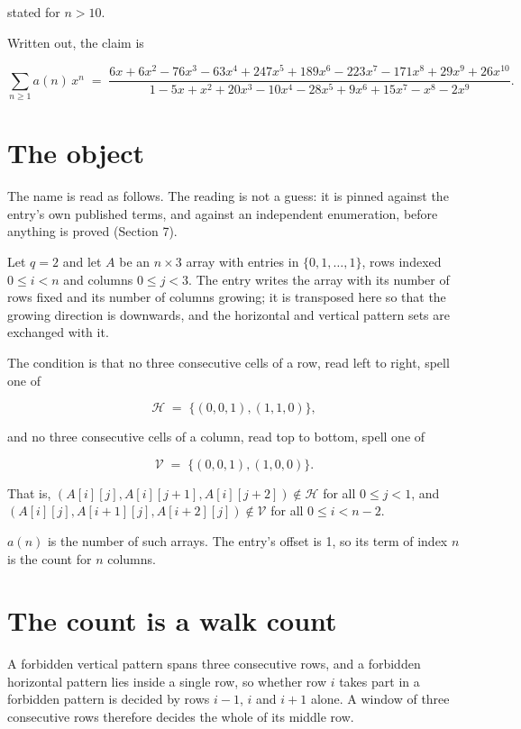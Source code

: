 \documentclass[11pt]{article}
\theoremstyle{definition}
\begin{document}
stated for $n > 10$.

Written out, the claim is

\[\sum_{n \ge 1} a(n)\,x^n \;=\; \frac{6x + 6x^{2} - 76x^{3} - 63x^{4} + 247x^{5} + 189x^{6} - 223x^{7} - 171x^{8} + 29x^{9} + 26x^{10}}{1 - 5x + x^{2} + 20x^{3} - 10x^{4} - 28x^{5} + 9x^{6} + 15x^{7} - x^{8} - 2x^{9}}.\]

\section{The object}

The name is read as follows. The reading is not a guess: it is pinned against the entry's own published terms, and against an independent enumeration, before anything is proved (Section 7).

Let $q = 2$ and let $A$ be an $n \times 3$ array with entries in $\{0,1,\dots,1\}$, rows indexed $0 \le i < n$ and columns $0 \le j < 3$. The entry writes the array with its number of rows fixed and its number of columns growing; it is transposed here so that the growing direction is downwards, and the horizontal and vertical pattern sets are exchanged with it.

The condition is that no three consecutive cells of a row, read left to right, spell one of

\[\mathcal{H} \;=\; \{(0,0,1), (1,1,0)\},\]

and no three consecutive cells of a column, read top to bottom, spell one of

\[\mathcal{V} \;=\; \{(0,0,1), (1,0,0)\}.\]

That is, $(A[i][j],A[i][j{+}1],A[i][j{+}2]) \notin \mathcal{H}$ for all $0 \le j < 1$, and $(A[i][j],A[i{+}1][j],A[i{+}2][j]) \notin \mathcal{V}$ for all $0 \le i < n-2$.

$a(n)$ is the number of such arrays. The entry's offset is 1, so its term of index $n$ is the count for $n$ columns.

\section{The count is a walk count}

A forbidden vertical pattern spans three consecutive rows, and a forbidden horizontal pattern lies inside a single row, so whether row $i$ takes part in a forbidden pattern is decided by rows $i-1$, $i$ and $i+1$ alone. A window of three consecutive rows therefore decides the whole of its middle row.
\end{document}
